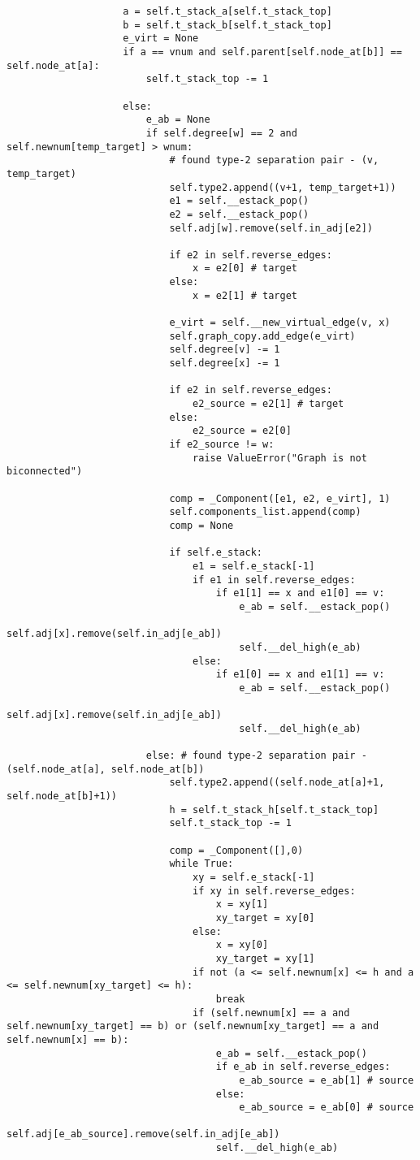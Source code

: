 \begin{verbatim}
					a = self.t_stack_a[self.t_stack_top]
					b = self.t_stack_b[self.t_stack_top]
					e_virt = None
					if a == vnum and self.parent[self.node_at[b]] == self.node_at[a]:
						self.t_stack_top -= 1

					else:
						e_ab = None
						if self.degree[w] == 2 and self.newnum[temp_target] > wnum:
							# found type-2 separation pair - (v, temp_target)
							self.type2.append((v+1, temp_target+1))
							e1 = self.__estack_pop()
							e2 = self.__estack_pop()
							self.adj[w].remove(self.in_adj[e2])

							if e2 in self.reverse_edges:
								x = e2[0] # target
							else:
								x = e2[1] # target

							e_virt = self.__new_virtual_edge(v, x)
							self.graph_copy.add_edge(e_virt)
							self.degree[v] -= 1
							self.degree[x] -= 1

							if e2 in self.reverse_edges:
								e2_source = e2[1] # target
							else:
								e2_source = e2[0]
							if e2_source != w:
								raise ValueError("Graph is not biconnected")

							comp = _Component([e1, e2, e_virt], 1)
							self.components_list.append(comp)
							comp = None

							if self.e_stack:
								e1 = self.e_stack[-1]
								if e1 in self.reverse_edges:
									if e1[1] == x and e1[0] == v:
										e_ab = self.__estack_pop()
										self.adj[x].remove(self.in_adj[e_ab])
										self.__del_high(e_ab)
								else:
									if e1[0] == x and e1[1] == v:
										e_ab = self.__estack_pop()
										self.adj[x].remove(self.in_adj[e_ab])
										self.__del_high(e_ab)

						else: # found type-2 separation pair - (self.node_at[a], self.node_at[b])
							self.type2.append((self.node_at[a]+1, self.node_at[b]+1))
							h = self.t_stack_h[self.t_stack_top]
							self.t_stack_top -= 1

							comp = _Component([],0)
							while True:
								xy = self.e_stack[-1]
								if xy in self.reverse_edges:
									x = xy[1]
									xy_target = xy[0]
								else:
									x = xy[0]
									xy_target = xy[1]
								if not (a <= self.newnum[x] <= h and a <= self.newnum[xy_target] <= h):
									break
								if (self.newnum[x] == a and self.newnum[xy_target] == b) or (self.newnum[xy_target] == a and self.newnum[x] == b):
									e_ab = self.__estack_pop()
									if e_ab in self.reverse_edges:
										e_ab_source = e_ab[1] # source
									else:
										e_ab_source = e_ab[0] # source
									self.adj[e_ab_source].remove(self.in_adj[e_ab])
									self.__del_high(e_ab)


\end{verbatim}
